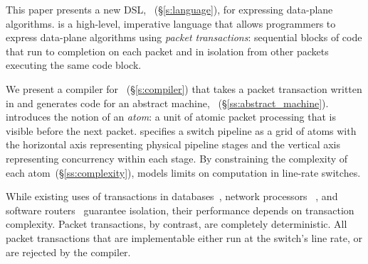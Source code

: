 


This paper presents a new DSL, \pktlanguage~(\S\ref{s:language}), for
expressing data-plane algorithms. \pktlanguage is a high-level, imperative
language that allows programmers to express data-plane algorithms using {\em
packet transactions}: sequential blocks of code that run to completion on each
packet and in isolation from other packets executing the same code block.

We present a compiler for \pktlanguage~(\S\ref{s:compiler}) that takes a packet
transaction written in \pktlanguage and generates code for an abstract machine,
\absmachine~(\S\ref{ss:abstract_machine}). \absmachine introduces the notion of
an \textit{atom}: a unit of atomic packet processing that is visible before the
next packet. \absmachine specifies a switch pipeline as a grid of atoms with
the horizontal axis representing physical pipeline stages and the vertical axis
representing concurrency within each stage. By constraining the complexity of
each atom~(\S\ref{ss:complexity}), \absmachine models limits on computation in
line-rate switches.

While existing uses of transactions in databases~\cite{db_trans}, network
processors ~\cite{npus}, and software routers~\cite{click} guarantee isolation,
their performance depends on transaction complexity. Packet transactions, by
contrast, are completely deterministic. All packet transactions that are
implementable either run at the switch's line rate, or are rejected by the
compiler.

